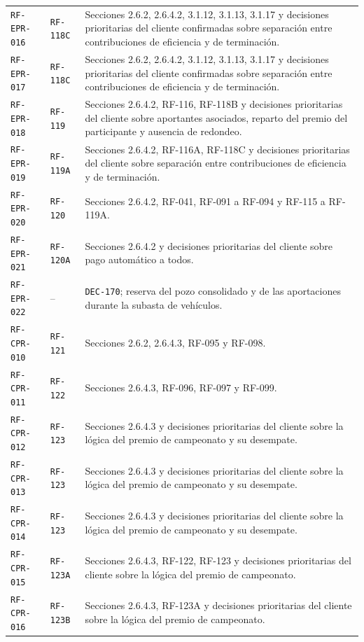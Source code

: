 \documentclass[10pt,letterpaper]{article}
\begin{document}
\begin{landscape}
\begin{longtable}{P{2.7cm}P{2.6cm}P{15.7cm}}
\texttt{RF-EPR-016} & \texttt{RF-118C} & Secciones 2.6.2, 2.6.4.2, 3.1.12, 3.1.13, 3.1.17 y decisiones prioritarias del cliente confirmadas sobre separación entre contribuciones de eficiencia y de terminación.\\
\texttt{RF-EPR-017} & \texttt{RF-118C} & Secciones 2.6.2, 2.6.4.2, 3.1.12, 3.1.13, 3.1.17 y decisiones prioritarias del cliente confirmadas sobre separación entre contribuciones de eficiencia y de terminación.\\
\texttt{RF-EPR-018} & \texttt{RF-119} & Secciones 2.6.4.2, RF-116, RF-118B y decisiones prioritarias del cliente sobre aportantes asociados, reparto del premio del participante y ausencia de redondeo.\\
\texttt{RF-EPR-019} & \texttt{RF-119A} & Secciones 2.6.4.2, RF-116A, RF-118C y decisiones prioritarias del cliente sobre separación entre contribuciones de eficiencia y de terminación.\\
\texttt{RF-EPR-020} & \texttt{RF-120} & Secciones 2.6.4.2, RF-041, RF-091 a RF-094 y RF-115 a RF-119A.\\
\texttt{RF-EPR-021} & \texttt{RF-120A} & Secciones 2.6.4.2 y decisiones prioritarias del cliente sobre pago automático a todos.\\
\texttt{RF-EPR-022} & -- & \texttt{DEC-170}; reserva del pozo consolidado y de las aportaciones durante la subasta de vehículos.\\
\texttt{RF-CPR-010} & \texttt{RF-121} & Secciones 2.6.2, 2.6.4.3, RF-095 y RF-098.\\
\texttt{RF-CPR-011} & \texttt{RF-122} & Secciones 2.6.4.3, RF-096, RF-097 y RF-099.\\
\texttt{RF-CPR-012} & \texttt{RF-123} & Secciones 2.6.4.3 y decisiones prioritarias del cliente sobre la lógica del premio de campeonato y su desempate.\\
\texttt{RF-CPR-013} & \texttt{RF-123} & Secciones 2.6.4.3 y decisiones prioritarias del cliente sobre la lógica del premio de campeonato y su desempate.\\
\texttt{RF-CPR-014} & \texttt{RF-123} & Secciones 2.6.4.3 y decisiones prioritarias del cliente sobre la lógica del premio de campeonato y su desempate.\\
\texttt{RF-CPR-015} & \texttt{RF-123A} & Secciones 2.6.4.3, RF-122, RF-123 y decisiones prioritarias del cliente sobre la lógica del premio de campeonato.\\
\texttt{RF-CPR-016} & \texttt{RF-123B} & Secciones 2.6.4.3, RF-123A y decisiones prioritarias del cliente sobre la lógica del premio de campeonato.\\

\end{longtable}
\end{landscape}
\end{document}
